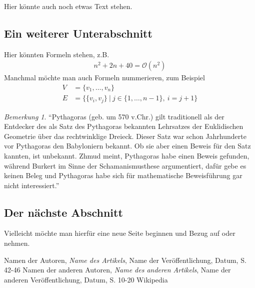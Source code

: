 \documentclass[a4paper]{article}
\def\O{\mathcal{O}}
\theoremstyle{definition}
\theoremstyle{remark}
\newtheorem*{remark}{Bemerkung}
\begin{document}
	\noindent
	Hier könnte auch noch etwas Text stehen.
	
	
	\subsection{Ein weiterer Unterabschnitt}
	Hier könnten Formeln stehen, z.B.
	\begin{align*}
		n^{2} + 2n + 40 = \O(n^{2})
	\end{align*}
	Manchmal möchte man auch Formeln nummerieren, zum Beispiel
	\begin{align}
		V &= \{v_1, \dots, v_n\} \label{eqn:formel_v}\\
		E &= \{\{v_{i}, v_{j}\}\ |\ j \in \{1, \dots, n-1\},\ i = j+1\} \label{eqn:formel_e}
	\end{align}
	

	\begin{remark} ``Pythagoras (geb. um 570 v.Chr.) gilt traditionell als der Entdecker des als Satz des Pythagoras bekannten Lehrsatzes der Euklidischen Geometrie über das rechtwinklige Dreieck. Dieser Satz war schon Jahrhunderte vor Pythagoras den Babyloniern bekannt. Ob sie aber einen Beweis für den Satz kannten, ist unbekannt. Zhmud meint, Pythagoras habe einen Beweis gefunden, während Burkert im Sinne der Schamanismusthese argumentiert, dafür gebe es keinen Beleg und Pythagoras habe sich für mathematische Beweisführung gar nicht interessiert.'' \cite{WIKI}
	\end{remark}
	

	
	\subsection{Der nächste Abschnitt}
	Vielleicht möchte man hierfür eine neue Seite beginnen und Bezug auf \cite{einequelle} oder \cite{eineanderequelle}
	nehmen.
	
		\newpage
	
	\begin{thebibliography}{2}
		 Namen der Autoren, \textit{Name des Artikels}, Name der Veröffentlichung, Datum, S. 42-46
		 Namen der anderen Autoren, \textit{Name des anderen Artikels}, Name der anderen Veröffentlichung, Datum, S. 10-20
		 Wikipedia
	\end{thebibliography}
\end{document}
